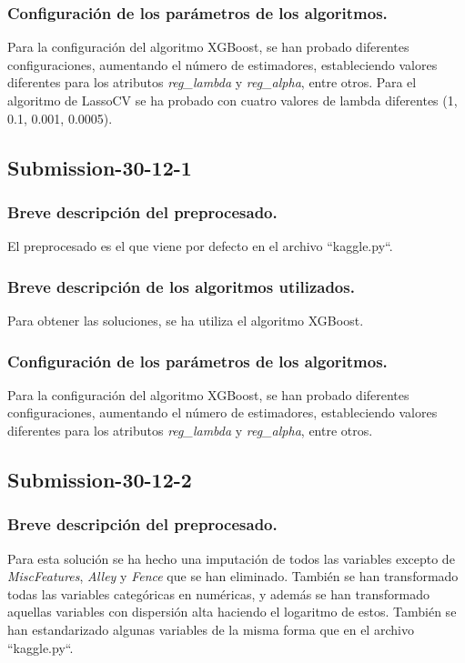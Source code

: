 	\subsubsection{Configuración de los parámetros de los algoritmos.}
	Para la configuración del algoritmo XGBoost, se han probado diferentes configuraciones, aumentando el número de estimadores, estableciendo valores diferentes para los atributos \textit{reg\_lambda} y \textit{reg\_alpha}, entre otros. Para el algoritmo de LassoCV se ha probado con cuatro valores de lambda diferentes (1, 0.1, 0.001, 0.0005).
	
	\subsection{Submission-30-12-1}
	\subsubsection{Breve descripción del preprocesado.}
	El preprocesado es el que viene por defecto en el archivo ``kaggle.py``.
	\subsubsection{Breve descripción de los algoritmos utilizados.}
	Para obtener las soluciones, se ha utiliza el algoritmo XGBoost.
	\subsubsection{Configuración de los parámetros de los algoritmos.}
	Para la configuración del algoritmo XGBoost, se han probado diferentes configuraciones, aumentando el número de estimadores, estableciendo valores diferentes para los atributos \textit{reg\_lambda} y \textit{reg\_alpha}, entre otros.
	
	\subsection{Submission-30-12-2}
	\subsubsection{Breve descripción del preprocesado.}
	Para esta solución se ha hecho una imputación de todos las variables excepto de \textit{MiscFeatures}, \textit{Alley} y \textit{Fence} que se han eliminado. También se han transformado todas las variables categóricas en numéricas, y además se han transformado aquellas variables con dispersión alta haciendo el logaritmo de estos. También se han estandarizado algunas variables de la misma forma que en el archivo ``kaggle.py``.
